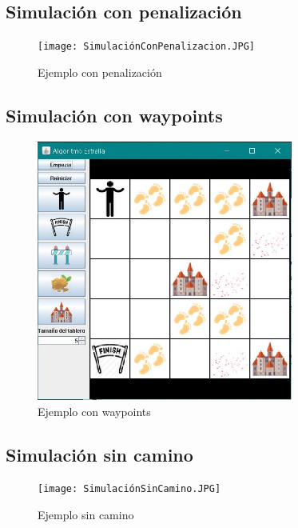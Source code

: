 \documentclass[12pt]{article}
\begin{document}
\subsection{Simulación con penalización}
\begin{figure}[H]
    \centering
    \texttt{[image: SimulaciónConPenalizacion.JPG]}
    \caption{Ejemplo con penalización}
\end{figure}
\subsection{Simulación con waypoints}
\begin{figure}[H]
    \centering
    \includegraphics[width=0.75\textwidth]{SimulacionConWaypoints.JPG}
    \caption{Ejemplo con waypoints}
\end{figure}
\subsection{Simulación sin camino}
\begin{figure}[H]
    \centering
    \texttt{[image: SimulaciónSinCamino.JPG]}
    \caption{Ejemplo sin camino}
\end{figure}
\end{document}
